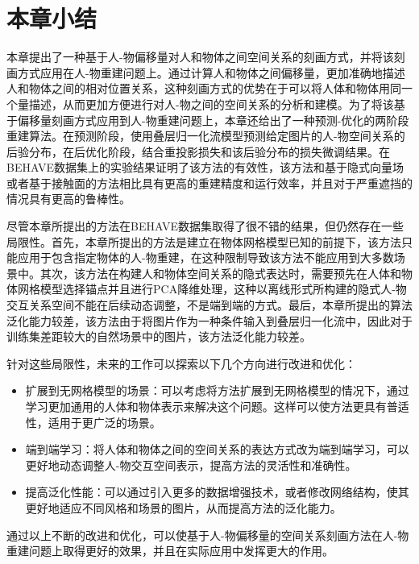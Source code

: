 \section{本章小结}
本章提出了一种基于人-物偏移量对人和物体之间空间关系的刻画方式，并将该刻画方式应用在人-物重建问题上。通过计算人和物体之间偏移量，更加准确地描述人和物体之间的相对位置关系，这种刻画方式的优势在于可以将人体和物体用同一个量描述，从而更加方便进行对人-物之间的空间关系的分析和建模。为了将该基于偏移量刻画方式应用到人-物重建问题上，本章还给出了一种预测-优化的两阶段重建算法。在预测阶段，使用叠层归一化流模型预测给定图片的人-物空间关系的后验分布，在后优化阶段，结合重投影损失和该后验分布的损失微调结果。在BEHAVE数据集上的实验结果证明了该方法的有效性，该方法和基于隐式向量场或者基于接触面的方法相比具有更高的重建精度和运行效率，并且对于严重遮挡的情况具有更高的鲁棒性。

尽管本章所提出的方法在BEHAVE数据集取得了很不错的结果，但仍然存在一些局限性。首先，本章所提出的方法是建立在物体网格模型已知的前提下，该方法只能应用于包含指定物体的人-物重建，在这种限制导致该方法不能应用到大多数场景中。其次，该方法在构建人和物体空间关系的隐式表达时，需要预先在人体和物体网格模型选择锚点并且进行PCA降维处理，这种以离线形式所构建的隐式人-物交互关系空间不能在后续动态调整，不是端到端的方式。最后，本章所提出的算法泛化能力较差，该方法由于将图片作为一种条件输入到叠层归一化流中，因此对于训练集差距较大的自然场景中的图片，该方法泛化能力较差。

针对这些局限性，未来的工作可以探索以下几个方向进行改进和优化：
\begin{itemize}
	\item 扩展到无网格模型的场景：可以考虑将方法扩展到无网格模型的情况下，通过学习更加通用的人体和物体表示来解决这个问题。这样可以使方法更具有普适性，适用于更广泛的场景。
	\item 端到端学习：将人体和物体之间的空间关系的表达方式改为端到端学习，可以更好地动态调整人-物交互空间表示，提高方法的灵活性和准确性。
	\item 提高泛化性能：可以通过引入更多的数据增强技术，或者修改网络结构，使其更好地适应不同风格和场景的图片，从而提高方法的泛化能力。
\end{itemize}
通过以上不断的改进和优化，可以使基于人-物偏移量的空间关系刻画方法在人-物重建问题上取得更好的效果，并且在实际应用中发挥更大的作用。